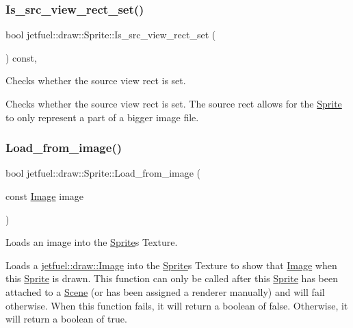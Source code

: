 \subsubsection{\texorpdfstring{Is\+\_\+src\+\_\+view\+\_\+rect\+\_\+set()}{Is\_src\_view\_rect\_set()}}
{\footnotesize\ttfamily bool jetfuel\+::draw\+::\+Sprite\+::\+Is\+\_\+src\+\_\+view\+\_\+rect\+\_\+set (\begin{DoxyParamCaption}{ }\end{DoxyParamCaption}) const\hspace{0.3cm}{\ttfamily [inline]}, {\ttfamily [protected]}}



Checks whether the source view rect is set. 

Checks whether the source view rect is set. The source rect allows for the \hyperlink{classjetfuel_1_1draw_1_1Sprite}{Sprite} to only represent a part of a bigger image file. \mbox{\label{classjetfuel_1_1draw_1_1Sprite_a370d0b3b2770348ae57ae5156c59a0ca}} 
\subsubsection{\texorpdfstring{Load\+\_\+from\+\_\+image()}{Load\_from\_image()}}
{\footnotesize\ttfamily bool jetfuel\+::draw\+::\+Sprite\+::\+Load\+\_\+from\+\_\+image (\begin{DoxyParamCaption}\item[{const \hyperlink{classjetfuel_1_1draw_1_1Image}{Image}}]{image }\end{DoxyParamCaption})}



Loads an image into the \hyperlink{classjetfuel_1_1draw_1_1Sprite}{Sprite}\textquotesingle{}s Texture. 

Loads a \hyperlink{classjetfuel_1_1draw_1_1Image}{jetfuel\+::draw\+::\+Image} into the \hyperlink{classjetfuel_1_1draw_1_1Sprite}{Sprite}\textquotesingle{}s Texture to show that \hyperlink{classjetfuel_1_1draw_1_1Image}{Image} when this \hyperlink{classjetfuel_1_1draw_1_1Sprite}{Sprite} is drawn. This function can only be called after this \hyperlink{classjetfuel_1_1draw_1_1Sprite}{Sprite} has been attached to a \hyperlink{classjetfuel_1_1draw_1_1Scene}{Scene} (or has been assigned a renderer manually) and will fail otherwise. When this function fails, it will return a boolean of false. Otherwise, it will return a boolean of true.


